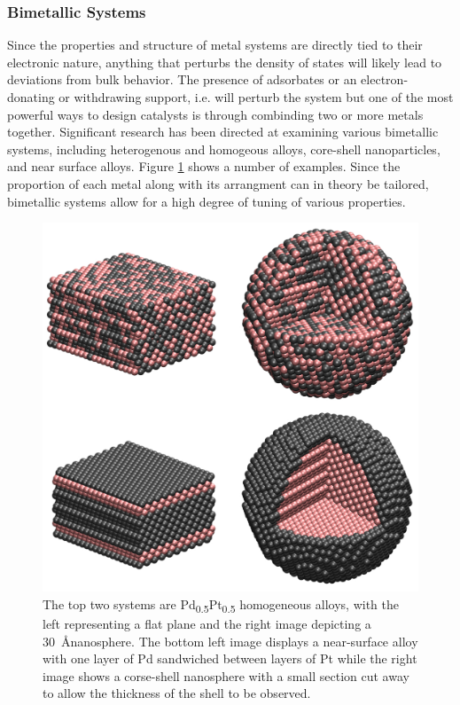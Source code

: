 \subsubsection{Bimetallic Systems}
Since the properties and structure of metal systems are directly tied to their
electronic nature, anything that perturbs the density of states will likely
lead to deviations from bulk behavior. The presence of adsorbates or an
electron-donating or withdrawing support, i.e.  will perturb the
system but one of the most powerful ways to design catalysts is through
combinding two or more metals together. Significant research has been directed
at examining various bimetallic systems, including heterogenous and homogeous
alloys, core-shell nanoparticles, and near surface alloys. Figure
\ref{fig:bimetallic} shows a number of examples. Since the proportion of each
metal along with its arrangment can in theory be tailored, bimetallic systems
allow for a high degree of tuning of various properties.

\begin{figure}[p!]
  \includegraphics[width=\linewidth]{../figures/chap1/bimetallic.pdf}
  \caption{The top two systems are Pd\textsubscript{0.5}Pt\textsubscript{0.5}
homogeneous alloys, with the left representing a flat plane and the right image
depicting a 30~\AA nanosphere. The bottom left image displays a near-surface
alloy with one layer of Pd sandwiched between layers of Pt while the right
image shows a corse-shell nanosphere with a small section cut away to allow the
thickness of the shell to be observed.}
\label{fig:bimetallic}
\end{figure}

